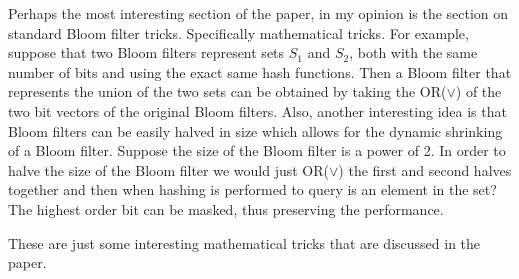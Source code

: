 \documentclass[MScCS]{uccthesis}
\begin{document}
Perhaps the most interesting section of the paper, in my opinion is the section on standard Bloom filter tricks. Specifically mathematical tricks. For example, suppose that two Bloom filters represent sets $S_1$ and $S_2$, both with the same number of bits and using the exact same hash functions. Then a Bloom filter that represents the union of the two sets can be obtained by taking the OR($\lor$) of the two bit vectors of the original Bloom filters. Also, another interesting idea is that Bloom filters can be easily halved in size which allows for the dynamic shrinking of a Bloom filter. Suppose the size of the Bloom filter is a power of 2. In order to halve the size of the Bloom filter we would just OR($\lor$) the first and second halves together and then when hashing is performed to query is an element in the set? The highest order bit can be masked, thus preserving the performance.

These are just some interesting mathematical tricks that are discussed in the paper.
\end{document}
